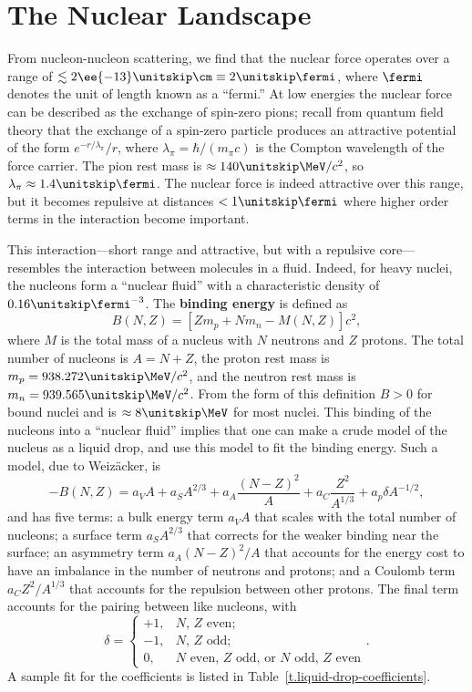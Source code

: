 
\section{The Nuclear Landscape}

From nucleon-nucleon scattering, we find that the nuclear force operates over a range of $\lesssim 2\ee{-13}\nsp\cm \equiv 2\nsp\fermi$, where $\fermi$ denotes the unit of length known as a ``fermi.''  At low energies the nuclear force can be described as the exchange of spin-zero pions; recall from quantum field theory that  the exchange of a spin-zero particle produces an attractive potential of the form $e^{-r/\lambda_{\pi}}/r$, where $\lambda_{\pi} = \hbar/(m_{\pi}c)$ is the Compton wavelength of the force carrier. The pion rest mass is $\approx 140\nsp\MeV/c^{2}$, so $\lambda_{\pi} \approx 1.4\nsp\fermi$.  The nuclear force is indeed attractive over this range,  but it becomes repulsive at distances $< 1\nsp\fermi$ where higher order terms in the interaction become important.

This interaction---short range and attractive, but with a repulsive core---resembles the interaction between molecules in a fluid.  Indeed, for heavy nuclei, the nucleons form a ``nuclear fluid'' with a characteristic density of $0.16\nsp\fermi^{-3}$.  The \textbf{binding energy} is defined as
\begin{equation}\label{e.binding-energy-def}
B(N,Z) = \left[Z m_{p} + N m_{n} - M(N,Z)\right] c^{2},
\end{equation}
where $M$ is the total mass of a nucleus with $N$ neutrons and $Z$ protons. The total number of nucleons is $A = N+Z$, the proton rest mass is $m_{p} = 938.272\nsp\MeV/c^{2}$, and the neutron rest mass is $m_{n} = 939.565\nsp\MeV/c^{2}$.
From the form of this definition $B > 0$ for bound nuclei and is $\approx 8\nsp\MeV$ for most nuclei. This binding of the nucleons into a ``nuclear fluid'' implies that one can make a crude model of the nucleus as a liquid drop, and use this model to fit the binding energy.
Such a model, due to Weiz\"acker, is
\begin{equation}\label{e.weizacker-fmla}
-B(N, Z) = a_{V} A + a_{S}A^{2/3} + a_{A}\frac{(N-Z)^{2}}{A} + a_{C}\frac{Z^{2}}{A^{1/3}} + a_{p}\delta A^{-1/2},
\end{equation}
and has five terms: a bulk energy term $a_{V}A$ that scales with the total number of nucleons; a surface term $a_{S}A^{2/3}$ that corrects for the weaker binding near the surface; an asymmetry term $a_{A}(N-Z)^{2}/A$ that accounts for the energy cost to have an imbalance in the number of neutrons and protons; and a Coulomb term $a_{C}Z^{2}/A^{1/3}$ that accounts for the repulsion between other protons.  
 The final term accounts for the pairing between like nucleons, with
\[
\delta = \left\{\begin{array}{lr}+1,& \textrm{$N$, $Z$ even;} \\-1,& \textrm{$N$, $Z$ odd;} \\ 0,& \textrm{$N$ even, $Z$ odd, or $N$ odd, $Z$ even}\end{array}\right. .
\]
A sample fit for the coefficients is listed in Table~\ref{t.liquid-drop-coefficients}.


